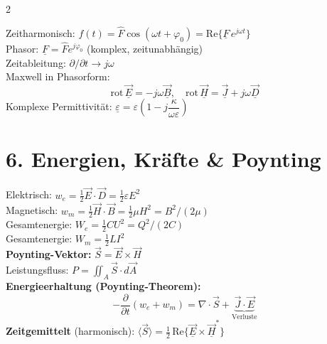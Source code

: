 \documentclass[a4paper, 7.5pt]{extarticle}
\begin{document}
\begin{multicols*}{2}
\begin{tcolorbox}[title={Komplexe Zeiger / Phasoren}]
Zeitharmonisch: $f(t) = \hat{F}\cos(\omega t+\varphi_0) = \text{Re}\{\underline{F}\,e^{j\omega t}\}$\\
Phasor: $\underline{F} = \hat{F}e^{j\varphi_0}$ \quad (komplex, zeitunabhängig)\\
Zeitableitung: $\partial/\partial t \longrightarrow j\omega$\\[3pt]
Maxwell in Phasorform:
$$\text{rot}\,\underline{\vec{E}} = -j\omega\underline{\vec{B}},\quad \text{rot}\,\underline{\vec{H}} = \underline{\vec{J}} + j\omega\underline{\vec{D}}$$
Komplexe Permittivität: $\underline{\varepsilon} = \varepsilon\!\left(1 - j\dfrac{\kappa}{\omega\varepsilon}\right)$
\end{tcolorbox}

\section*{6. Energien, Kräfte \& Poynting}

\begin{tcolorbox}[title={Elektromagnetische Energiedichten}]
Elektrisch: $w_e = \tfrac{1}{2}\vec{E}\cdot\vec{D} = \tfrac{1}{2}\varepsilon E^2$ \;\text{\textcolor{boxtitle}{[\(J/m^3\)]}}\\
Magnetisch: $w_m = \tfrac{1}{2}\vec{H}\cdot\vec{B} = \tfrac{1}{2}\mu H^2 = B^2/(2\mu)$ \;\text{\textcolor{boxtitle}{[\(J/m^3\)]}}\\[3pt]
Gesamtenergie: $W_e = \tfrac{1}{2}CU^2 = Q^2/(2C)$ \;\text{\textcolor{boxtitle}{[\(J\)]}}\\
Gesamtenergie: $W_m = \tfrac{1}{2}LI^2$ \;\text{\textcolor{boxtitle}{[\(J\)]}}\\[3pt]
\textbf{Poynting-Vektor:} $\vec{S} = \vec{E}\times\vec{H}$ \;\text{\textcolor{boxtitle}{[\(W/m^2\)]}}\\
Leistungsfluss: $P = \iint_A\vec{S}\cdot d\vec{A}$ \;\text{\textcolor{boxtitle}{[\(W\)]}}\\[3pt]
\textbf{Energieerhaltung (Poynting-Theorem):}
$$-\frac{\partial}{\partial t}(w_e+w_m) = \nabla\cdot\vec{S} + \underbrace{\vec{J}\cdot\vec{E}}_{\text{Verluste}}$$
\textbf{Zeitgemittelt} (harmonisch): $\langle\vec{S}\rangle = \tfrac{1}{2}\,\text{Re}\{\underline{\vec{E}}\times\underline{\vec{H}}^*\}$
\end{tcolorbox}


\end{multicols*}
\end{document}
